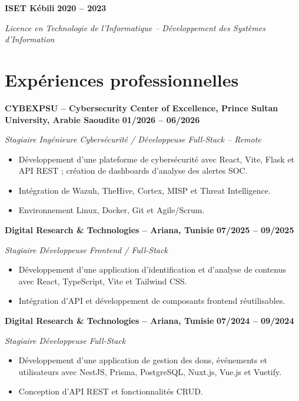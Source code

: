 \documentclass[10pt,a4paper]{article}
\begin{document}
\textbf{ISET Kébili}
\hfill \textbf{2020 -- 2023}

\textit{Licence en Technologie de l'Informatique -- Développement des Systèmes d'Information}



\section*{Expériences professionnelles}

\textbf{CYBEXPSU -- Cybersecurity Center of Excellence, Prince Sultan University,
Arabie Saoudite}
\hfill \textbf{01/2026 -- 06/2026}

\textit{Stagiaire Ingénieure Cybersécurité / Développeuse Full-Stack -- Remote}

\begin{itemize}
    \item Développement d'une plateforme de cybersécurité avec React, Vite,
    Flask et API REST ; création de dashboards d'analyse des alertes SOC.
    \item Intégration de Wazuh, TheHive, Cortex, MISP et Threat Intelligence.
    \item Environnement Linux, Docker, Git et Agile/Scrum.
\end{itemize}

\textbf{Digital Research \& Technologies -- Ariana, Tunisie}
\hfill \textbf{07/2025 -- 09/2025}

\textit{Stagiaire Développeuse Frontend / Full-Stack}

\begin{itemize}
    \item Développement d'une application d'identification et d'analyse de
    contenus avec React, TypeScript, Vite et Tailwind CSS.
    \item Intégration d'API et développement de composants frontend réutilisables.
\end{itemize}

\textbf{Digital Research \& Technologies -- Ariana, Tunisie}
\hfill \textbf{07/2024 -- 09/2024}

\textit{Stagiaire Développeuse Full-Stack}

\begin{itemize}
    \item Développement d'une application de gestion des dons, événements et
    utilisateurs avec NestJS, Prisma, PostgreSQL, Nuxt.js, Vue.js et Vuetify.
    \item Conception d'API REST et fonctionnalités CRUD.
\end{itemize}
\end{document}
